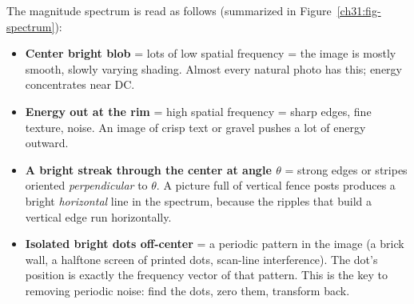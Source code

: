 The magnitude spectrum is read as follows (summarized in
Figure~\ref{ch31:fig-spectrum}):
\begin{itemize}
\item \textbf{Center bright blob} = lots of low spatial frequency = the image is
mostly smooth, slowly varying shading. Almost every natural photo has this; energy
concentrates near DC.
\item \textbf{Energy out at the rim} = high spatial frequency = sharp edges, fine
texture, noise. An image of crisp text or gravel pushes a lot of energy outward.
\item \textbf{A bright streak through the center at angle $\theta$} = strong edges
or stripes oriented \emph{perpendicular} to $\theta$. A picture full of vertical
fence posts produces a bright \emph{horizontal} line in the spectrum, because the
ripples that build a vertical edge run horizontally.
\item \textbf{Isolated bright dots off-center} = a periodic pattern in the image
(a brick wall, a halftone screen of printed dots, scan-line interference). The dot's position is
exactly the frequency vector of that pattern. This is the key to removing periodic
noise: find the dots, zero them, transform back.
\end{itemize}
